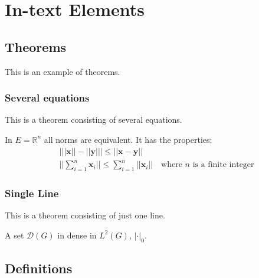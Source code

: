 \documentclass[11pt,fleqn,a5paper]{book} %
\begin{document}
    
    \chapter{In-text Elements}
    
    \section{Theorems}
    
    This is an example of theorems.
    
    \subsection{Several equations}
    This is a theorem consisting of several equations.
    
    \begin{theorem}
    In $E=\mathbb{R}^n$ all norms are equivalent. It has the properties:
    \begin{align}
    & \big| ||\mathbf{x}|| - ||\mathbf{y}|| \big|\leq || \mathbf{x}- \mathbf{y}||\\
    &  ||\sum_{i=1}^n\mathbf{x}_i||\leq \sum_{i=1}^n||\mathbf{x}_i||\quad\text{where $n$ is a finite integer}
    \end{align}
    \end{theorem}
    
    \subsection{Single Line}
    This is a theorem consisting of just one line.
    
    \begin{theorem}
    A set $\mathcal{D}(G)$ in dense in $L^2(G)$, $|\cdot|_0$. 
    \end{theorem}
    
    
    \section{Definitions}
    
\end{document}
